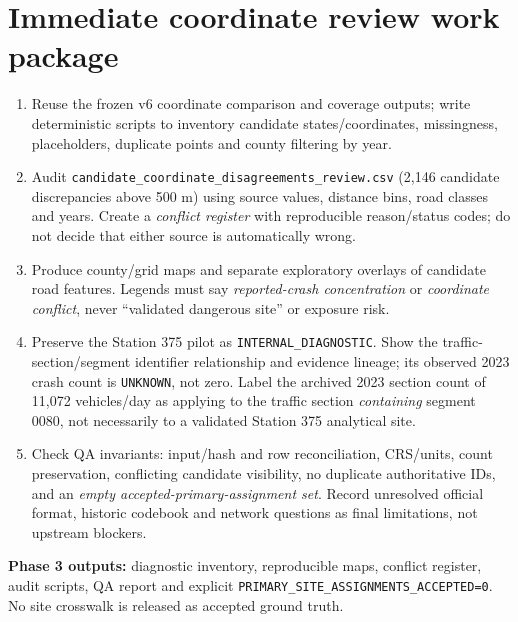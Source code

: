 \documentclass[11pt,a4paper,openany]{report}
\newcommand{\pathcode}[1]{\nolinkurl{#1}}
\begin{document}
\section{Immediate coordinate review work package}
\begin{enumerate}
\item Reuse the frozen v6 coordinate comparison and coverage outputs; write deterministic scripts to inventory candidate states/coordinates, missingness, placeholders, duplicate points and county filtering by year.
\item Audit \pathcode{candidate_coordinate_disagreements_review.csv} (2,146 candidate discrepancies above 500 m) using source values, distance bins, road classes and years. Create a \emph{conflict register} with reproducible reason/status codes; do not decide that either source is automatically wrong.
\item Produce county/grid maps and separate exploratory overlays of candidate road features. Legends must say \emph{reported-crash concentration} or \emph{coordinate conflict}, never ``validated dangerous site'' or exposure risk.
\item Preserve the Station 375 pilot as \pathcode{INTERNAL_DIAGNOSTIC}. Show the traffic-section/segment identifier relationship and evidence lineage; its observed 2023 crash count is \pathcode{UNKNOWN}, not zero. Label the archived 2023 section count of 11,072 vehicles/day as applying to the traffic section \emph{containing} segment 0080, not necessarily to a validated Station 375 analytical site.
\item Check QA invariants: input/hash and row reconciliation, CRS/units, count preservation, conflicting candidate visibility, no duplicate authoritative IDs, and an \emph{empty accepted-primary-assignment set}. Record unresolved official format, historic codebook and network questions as final limitations, not upstream blockers.
\end{enumerate}
\textbf{Phase 3 outputs:} diagnostic inventory, reproducible maps, conflict register, audit scripts, QA report and explicit \pathcode{PRIMARY_SITE_ASSIGNMENTS_ACCEPTED=0}. No site crosswalk is released as accepted ground truth.
\end{document}
